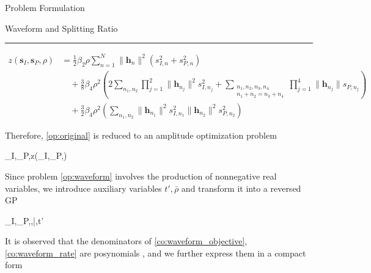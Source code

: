 \documentclass[journal]{IEEEtran}
\begin{document}
\begin{section}{Problem Formulation}
\begin{subsection}{Waveform and Splitting Ratio}
\begin{equation}
		\end{equation}
		\begin{figure*}[b]
			\hrule
			\begin{equation}\label{eq:z_waveform}
				\begin{split}
					z(\boldsymbol{s}_I,\boldsymbol{s}_P,\rho)
					& = \frac{1}{2}{\beta_2}{\rho} \sum_{n=1}^N \lVert{\boldsymbol{h}_n}\rVert^2(s_{I,n}^2+s_{P,n}^2)\\
					& \quad + \frac{3}{8}{\beta_4}{\rho^2} \left( 2\sum_{n_1,n_2} \prod_{j=1}^2 \lVert{\boldsymbol{h}_{n_j}}\rVert^2 s_{I,{n_j}}^2 + \sum_{\substack{{n_1},{n_2},{n_3},{n_4}\\{n_1}+{n_2}={n_3}+{n_4}}} \prod_{j=1}^4 \lVert{\boldsymbol{h}_{n_j}}\rVert s_{P,{n_j}} \right)\\
					& \quad + \frac{3}{2}{\beta_4}{\rho^2} \left( \sum_{n_1,n_2} \lVert{\boldsymbol{h}_{n_1}}\rVert^2 s_{I,{n_1}}^2 \lVert{\boldsymbol{h}_{n_2}}\rVert^2 s_{P,{n_2}}^2 \right)
				\end{split}
			\end{equation}
		\end{figure*}
		Therefore, \ref{op:original} is reduced to an amplitude optimization problem
		\begin{maxi!}
			{\boldsymbol{s}_I,_P,\rho}{z(\boldsymbol{s}_I,_P,\rho)}{\label{op:waveform}}{}
		\end{maxi!}
		Since problem \ref{op:waveform} involves the production of nonnegative real variables, we introduce auxiliary variables $t',\bar{\rho}$ and transform it into a reversed GP
		\begin{mini!}
			{\boldsymbol{s}_I,_P,\rho,\bar{\rho},t'}{}{\label{op:waveform_rgp}}{}
			\label{co:waveform_power}
			\label{co:waveform_objective}
			\label{co:waveform_rate}
		\end{mini!}
		It is observed that the denominators of \ref{co:waveform_objective}, \ref{co:waveform_rate} are posynomials \cite{Boyd2007}, and we further express them in a compact form

\end{subsection}
\end{section}
\end{document}

